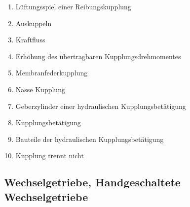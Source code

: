 \begin{enumerate}
\item
  Lüftungsspiel einer Reibungskupplung\\
\item
  Auskuppeln\\
\item
  Kraftfluss\\
\item
  Erhöhung des übertragbaren Kupplungsdrehmomentes\\
\item
  Membranfederkupplung\\
\item
  Nasse Kupplung\\
\item
  Geberzylinder einer hydraulischen Kupplungsbetätigung\\
\item
  Kupplungsbetätigung\\
\item
  Bauteile der hydraulischen Kupplungsbetätigung\\
\item
  Kupplung trennt nicht
\end{enumerate}

\subsection{Wechselgetriebe, Handgeschaltete
Wechselgetriebe}\label{wechselgetriebe-handgeschaltete-wechselgetriebe}

